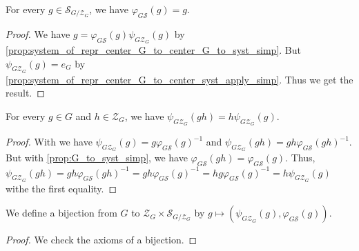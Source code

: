 \begin{proposition}
    \label{prop:system_of_repr_center_G_to_syst_simp_id}
    \leanok
    For every $g\in \mathcal{S}_{G/\mathcal{Z}_G}$, we have $\varphi_{G\mathcal{S}}(g)=g$.
\end{proposition}
\begin{proof}
    \leanok
    We have $g=\varphi_{G\mathcal{S}}(g) \psi_{G\mathcal{Z}_G}(g)$ by \ref{prop:system_of_repr_center_G_to_center_G_to_syst_simp}.
    But $\psi_{G\mathcal{Z}_G}(g)=e_G$ by \ref{prop:system_of_repr_center_G_to_center_syst_apply_simp}.
    Thus we get the result.
\end{proof}

\begin{proposition}
    \label{prop:system_of_repr_center_G_to_center_mul_simp}
    \leanok
    For every $g\in G$ and $h\in\mathcal{Z}_G$, we have $\psi_{G\mathcal{Z}_G}(gh)=h\psi_{G\mathcal{Z}_G}(g)$.
\end{proposition}
\begin{proof}
    \leanok
    With \label{prop:system_of_repr_center_G_to_center_eq_G_G_to_syst_simp} we have $\psi_{G\mathcal{Z}_G}(g)=g\varphi_{G\mathcal{S}}(g)^{-1}$
    and $\psi_{G\mathcal{Z}_G}(gh)=gh\varphi_{G\mathcal{S}}(gh)^{-1}$.
    But with \ref{prop:G_to_syst_simp}, we have $\varphi_{G\mathcal{S}}(gh)=\varphi_{G\mathcal{S}} (g)$.
    Thus, $\psi_{G\mathcal{Z}_G}(gh)=gh\varphi_{G\mathcal{S}}(gh)^{-1}=gh\varphi_{G\mathcal{S}} (g)^{-1}=
    hg\varphi_{G\mathcal{S}} (g)^{-1}=h\psi_{G\mathcal{Z}_G}(g)$ withe the first equality.
\end{proof}

\begin{definition}
    \label{def:system_of_repr_set_center_iso_G}
    \leanok
    We define a bijection from $G$ to $\mathcal{Z}_G\times\mathcal{S}_{G/\mathcal{Z}_G}$ by 
    $g\mapsto (\psi_{G\mathcal{Z}_G}(g),\varphi_{G\mathcal{S}} (g))$.
    \begin{proof}
        \leanok
        We check the axioms of a bijection.
    \end{proof}
\end{definition}

